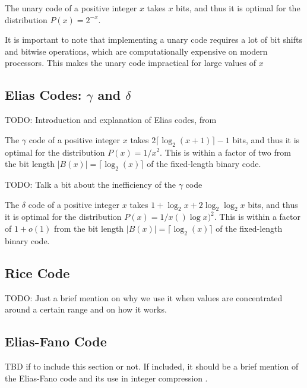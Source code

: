 \begin{theorem}
    The unary code of a positive integer $x$ takes $x$ bits, and thus it is optimal for the distribution $P(x)=2^{-x}$.
\end{theorem}

\noindent It is important to note that implementing a unary code requires a lot of bit shifts and bitwise operations, which are computationally expensive on modern processors. This makes the unary code impractical for large values of $x$

\subsection{Elias Codes: $\gamma$ and $\delta$}
TODO: Introduction and explanation of Elias codes, from \cite{ferragina2023pearls,Elias1975}

\begin{theorem}
    The $\gamma$ code of a positive integer $x$ takes $2\lceil\log_2(x+1)\rceil-1$ bits, and thus it is optimal for the distribution $P(x)=1/x^2$. This is within a factor of two from the bit length $|B(x)| = \lceil\log_2(x)\rceil$ of the fixed-length binary code. \cite{ferragina2023pearls}
\end{theorem}
TODO: Talk a bit about the inefficiency of the $\gamma$ code \cite{ferragina2023pearls}

\begin{theorem}
    The $\delta$ code of a positive integer $x$ takes $1 + \log_2x + 2\log_2 \log_2 x$ bits, and thus it is optimal for the distribution $P(x)=1/x()\log x)^2$. This is within a factor of $1 + o(1)$ from the bit length $|B(x)| = \lceil\log_2(x)\rceil$ of the fixed-length binary code. \cite{ferragina2023pearls}
\end{theorem}



\subsection{Rice Code}
TODO: Just a brief mention on why we use it when values are concentrated around a certain range \cite{ferragina2023pearls,sayood2002lossless} and on how it works.

\subsection{Elias-Fano Code}
TBD if to include this section or not. If included, it should be a brief mention of the Elias-Fano code and its use in integer compression \cite{ferragina2023pearls}.
